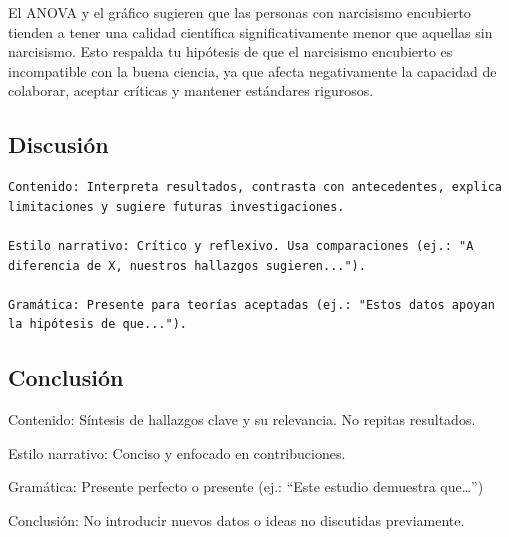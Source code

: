\documentclass[
]{article}
\begin{document}
El ANOVA y el gráfico sugieren que las personas con narcisismo
encubierto tienden a tener una calidad científica significativamente
menor que aquellas sin narcisismo. Esto respalda tu hipótesis de que el
narcisismo encubierto es incompatible con la buena ciencia, ya que
afecta negativamente la capacidad de colaborar, aceptar críticas y
mantener estándares rigurosos.

\subsection{Discusión}\label{discusiuxf3n}

\begin{tcolorbox}[enhanced jigsaw, colbacktitle=quarto-callout-tip-color!10!white, titlerule=0mm, coltitle=black, bottomtitle=1mm, breakable, title=\textcolor{quarto-callout-tip-color}{\faLightbulb}\hspace{0.5em}{Tip}, colframe=quarto-callout-tip-color-frame, toptitle=1mm, arc=.35mm, bottomrule=.15mm, opacityback=0, leftrule=.75mm, toprule=.15mm, rightrule=.15mm, opacitybacktitle=0.6, left=2mm, colback=white]

\begin{verbatim}
Contenido: Interpreta resultados, contrasta con antecedentes, explica limitaciones y sugiere futuras investigaciones.

Estilo narrativo: Crítico y reflexivo. Usa comparaciones (ej.: "A diferencia de X, nuestros hallazgos sugieren...").

Gramática: Presente para teorías aceptadas (ej.: "Estos datos apoyan la hipótesis de que...").
\end{verbatim}

\end{tcolorbox}

\subsection{Conclusión}\label{conclusiuxf3n}

\begin{tcolorbox}[enhanced jigsaw, colbacktitle=quarto-callout-tip-color!10!white, titlerule=0mm, coltitle=black, bottomtitle=1mm, breakable, title=\textcolor{quarto-callout-tip-color}{\faLightbulb}\hspace{0.5em}{Tip}, colframe=quarto-callout-tip-color-frame, toptitle=1mm, arc=.35mm, bottomrule=.15mm, opacityback=0, leftrule=.75mm, toprule=.15mm, rightrule=.15mm, opacitybacktitle=0.6, left=2mm, colback=white]

Contenido: Síntesis de hallazgos clave y su relevancia. No repitas
resultados.

Estilo narrativo: Conciso y enfocado en contribuciones.

Gramática: Presente perfecto o presente (ej.: ``Este estudio demuestra
que\ldots{}'')

Conclusión: No introducir nuevos datos o ideas no discutidas
previamente.

\end{tcolorbox}
\end{document}
